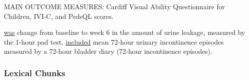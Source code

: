 \documentclass{ctexbook}
\begin{document}
    \begin{eg}[label={eg:2s5-1}]{}
      MAIN OUTCOME MEASURES: Cardiff Visual Ability Questionnaire for Children, IVI-C, and PedsQL scores.
    \end{eg}

    \begin{eg}[label={eg:2s5-2}]{}
       \uline{was} change from baseline to week 6 in the amount of urine leakage, measured by the 1-hour pad test.  \uline{included} mean 72-hour urinary incontinence episodes measured by a 72-hour bladder diary (72-hour incontinence episodes).
    \end{eg}

    \subsubsection{Lexical Chunks}
\end{document}
